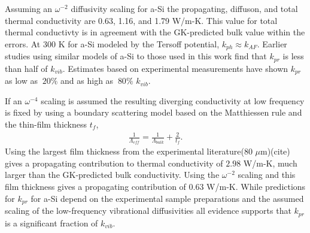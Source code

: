 \documentclass[aps,prb,onecolumn,preprint,superscriptaddress,footinbib,amsmath,amssymb,floatfix]{revtex4}
\begin{document}
Assuming an $\omega^{-2}$ diffusivity scaling for a-Si 
the propagating, diffuson, and total thermal conductivity are 
0.63, 1.16, and 1.79 W/m-K. This value for total thermal conductivty 
is in agreement with the GK-predicted bulk value within the errors.
At 300 K for a-Si modeled by the Tersoff potential,   
$k_{ph} \approx k_{AF}$.\cite{he_heat_2011} Earlier studies using 
similar models of a-Si to those used in this work find 
that $k_{pr}$ is less than half of 
$k_{vib}$.\cite{feldman_thermal_1993,
feldman_numerical_1999} 
Estimates based on experimental measurements 
have shown $k_{pr}$ as low as 
$~20\%$\cite{cahill_thermal_1994,feldman_numerical_1999} 
and as high as $~80\%$ $k_{vib}$.
\cite{liu_high_2009,yang_anomalously_2010}

If an $\omega^{-4}$ scaling is assumed 
the resulting diverging conductivity at low frequency is fixed by 
using a boundary scattering model based on the Matthiessen 
rule and the thin-film thickness $t_f$,\cite{sellan_cross-plane_2010} 
\begin{equation}\label{EQ:LambdaMatth}
\begin{split}
\frac{1}{\Lambda_{eff}} = \frac{1}{\Lambda_{bulk}} + 
\frac{2}{t_f}.
\end{split}
\end{equation}
Using the largest film thickness from the experimental 
literature($80$ $\mu$m)(cite) gives a propagating contribution 
to thermal conductivity of $2.98$ W/m-K, much larger than the 
GK-predicted bulk conductivity. 
Using the $\omega^{-2}$ scaling and this film thickness 
gives a propagating contribution of 0.63 W/m-K. 
While predictions for $k_{pr}$ for a-Si 
depend on the experimental sample preparations
\cite{cahill_thermal_1994,
liu_high_2009,yang_anomalously_2010,regner_broadband_2013}
and the assumed scaling of the low-frequency 
vibrational diffusivities
\cite{feldman_thermal_1993,cahill_thermal_1994,
feldman_numerical_1999,liu_high_2009,yang_anomalously_2010} 
all evidence supports that $k_{pr}$ is a significant fraction 
of $k_{vib}$.
\cite{feldman_thermal_1993,cahill_thermal_1994,
feldman_numerical_1999,liu_high_2009,
yang_anomalously_2010,
he_heat_2011,regner_broadband_2013}
\end{document}
